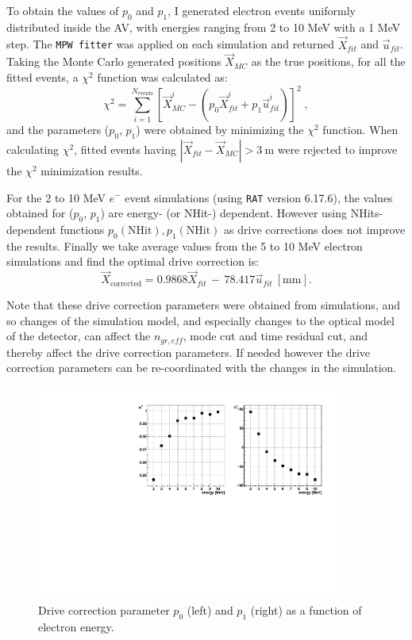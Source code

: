 To obtain the values of $p_0$ and $p_1$, I generated electron events uniformly distributed inside the AV, with energies ranging from 2 to 10 MeV with a 1 MeV step. The \texttt{MPW fitter} was applied on each simulation and returned $\vec{X}_{fit}$ and $\vec{u}_{fit}$. Taking the Monte Carlo generated positions $\vec{X}_{MC}$ as the true positions, for all the fitted events, a $\chi^2$ function was calculated as:
\begin{equation}
\chi^2 = \sum_{i=1}^{N_{\mathrm{events}}}[\vec{X}^i_{MC}-(p_0\vec{X}^i_{fit}+p_1\vec{u}^i_{fit})]^2 \; ,
\end{equation}
and the parameters ($p_0$, $p_1$) were obtained by minimizing the $\chi^2$ function. When calculating $\chi^2$, fitted events having $|\vec{X}_{fit}-\vec{X}_{MC}| > 3~\mathrm{m}$ were rejected to improve the $\chi^2$ minimization results.

For the 2 to 10 MeV $e^-$ event simulations (using \texttt{RAT} version 6.17.6), the values obtained for ($p_0$, $p_1$) are energy- (or NHit-) dependent. However using NHits-dependent functions $p_0(\mathrm{NHit}), p_1(\mathrm{NHit})$ as drive corrections does not improve the results. 
Finally we take average values from the 5 to 10 MeV electron simulations and find the optimal drive correction is: 
\begin{equation}
\vec{X}_{\mathrm{corrected}} = 0.9868\vec{X}_{fit} \, - \, 78.417\vec{u}_{fit}~\mathrm{[mm]} .
\end{equation}

Note that these drive correction parameters were obtained from simulations, and so changes of the simulation model, and especially changes to the optical model of the detector, can affect the $n_{gr,eff}$, mode cut and time residual cut, and thereby affect the drive correction parameters. If needed however the drive correction parameters can be re-coordinated with the changes in the simulation.

\begin{figure}[!htb]
	\centering
	\includegraphics[width=10cm]{pullParVsEnergy.pdf}
	\caption{Drive correction parameter $p_0$ (left) and $p_1$ (right) as a function of electron energy.}
	\label{pullParVsEnergy}
\end{figure}

